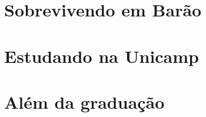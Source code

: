 \documentclass[a4paper,10pt,oldfontcommands]{memoir}
\begin{document}

\clearpage



\chapter{Sobrevivendo em Barão}

\newpage

\newpage

\newpage

\newpage


\chapter{Estudando na Unicamp}

\newpage

\newpage

\newpage

\newpage

\newpage

\newpage


\chapter{Além da graduação}

\newpage

\newpage

\newpage

\newpage

\newpage

\end{document}
